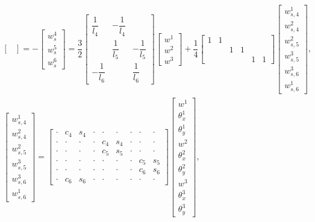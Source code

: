 \documentclass[a4paper,10pt,fleqn]{article}
\begin{document}
\begin{gather}
\begin{bmatrix}
\end{bmatrix}=-\begin{bmatrix}
w_s^4\\w_s^5\\w_s^6
\end{bmatrix}=\dfrac{3}{2}\begin{bmatrix}
\dfrac{1}{l_4}&-\dfrac{1}{l_4}&\\
&\dfrac{1}{l_5}&-\dfrac{1}{l_5}\\
-\dfrac{1}{l_6}&&\dfrac{1}{l_6}
\end{bmatrix}\begin{bmatrix}
w^1\\w^2\\w^3
\end{bmatrix}+\dfrac{1}{4}\begin{bmatrix}
1&1&&&&\\
&&1&1&&\\
&&&&1&1
\end{bmatrix}\begin{bmatrix}
w_{s,4}^1\\w_{s,4}^2\\w_{s,5}^2\\w_{s,5}^3\\w_{s,6}^3\\w_{s,6}^1
\end{bmatrix},\\
\begin{bmatrix}
w_{s,4}^1\\w_{s,4}^2\\w_{s,5}^2\\w_{s,5}^3\\w_{s,6}^3\\w_{s,6}^1
\end{bmatrix}=
\begin{bmatrix}
	\cdot & c_4   & s_4   & \cdot & \cdot & \cdot & \cdot & \cdot & \cdot \\
	\cdot & \cdot & \cdot & \cdot & c_4   & s_4   & \cdot & \cdot & \cdot \\
	\cdot & \cdot & \cdot & \cdot & c_5   & s_5   & \cdot & \cdot & \cdot \\
	\cdot & \cdot & \cdot & \cdot & \cdot & \cdot & \cdot & c_5   & s_5   \\
	\cdot & \cdot & \cdot & \cdot & \cdot & \cdot & \cdot & c_6   & s_6   \\
	\cdot & c_6   & s_6   & \cdot & \cdot & \cdot & \cdot & \cdot & \cdot
\end{bmatrix}
\begin{bmatrix}
w^1\\\theta_x^1\\\theta_y^1\\w^2\\\theta_x^2\\\theta_y^2\\w^3\\\theta_x^3\\\theta_y^3
\end{bmatrix},
\end{gather}
\end{document}

